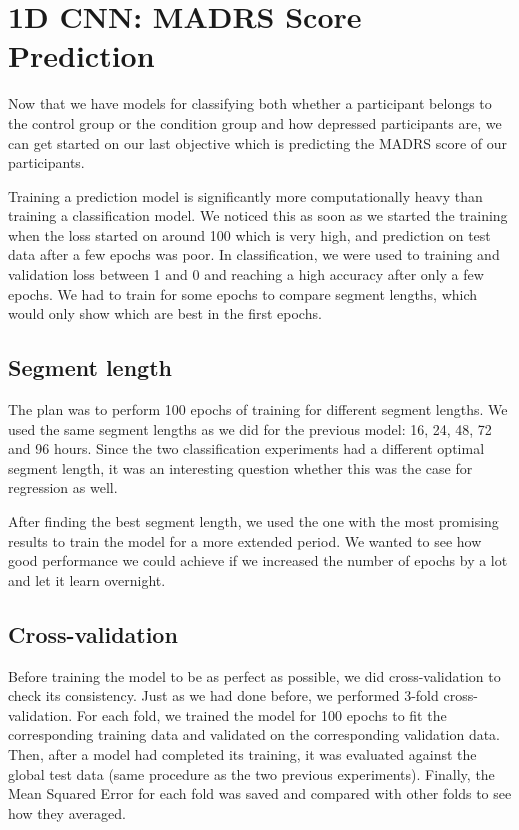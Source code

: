 \section{1D CNN: MADRS Score Prediction}
Now that we have models for classifying both whether a participant belongs to the control group or the condition group and how depressed participants are, we can get started on our last objective which is predicting the MADRS score of our participants. 

Training a prediction model is significantly more computationally heavy than training a classification model. We noticed this as soon as we started the training when the loss started on around 100 which is very high, and prediction on test data after a few epochs was poor. In classification, we were used to training and validation loss between 1 and 0 and reaching a high accuracy after only a few epochs. We had to train for some epochs to compare segment lengths, which would only show which are best in the first epochs.

\subsection{Segment length}
The plan was to perform 100 epochs of training for different segment lengths. We used the same segment lengths as we did for the previous model: 16, 24, 48, 72 and 96 hours. Since the two classification experiments had a different optimal segment length, it was an interesting question whether this was the case for regression as well. 

After finding the best segment length, we used the one with the most promising results to train the model for a more extended period. We wanted to see how good performance we could achieve if we increased the number of epochs by a lot and let it learn overnight. 

\subsection{Cross-validation}
Before training the model to be as perfect as possible, we did cross-validation to check its consistency. Just as we had done before, we performed 3-fold cross-validation. For each fold, we trained the model for 100 epochs to fit the corresponding training data and validated on the corresponding validation data. Then, after a model had completed its training, it was evaluated against the global test data (same procedure as the two previous experiments). Finally, the Mean Squared Error for each fold was saved and compared with other folds to see how they averaged. 

